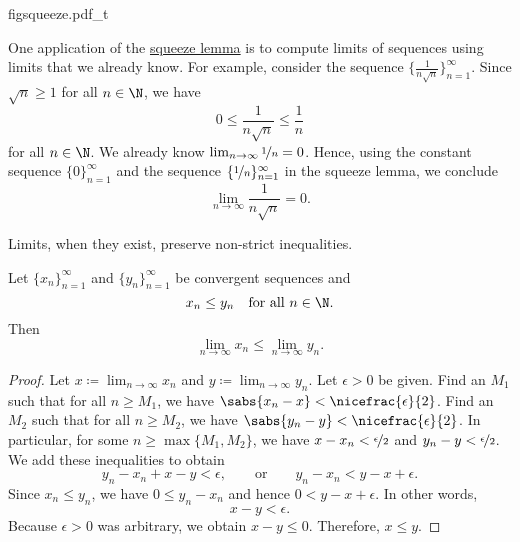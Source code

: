 \begin{myfigureht}
{figsqueeze.pdf_t}
\caption{Squeeze lemma proof in picture.\label{figsqueeze}}
\end{myfigureht}

\begin{example}
One application of
the \hyperref[squeeze:lemma]{squeeze lemma} is to compute limits of 
sequences using limits that we already know.  For example, consider
the sequence $\bigl\{ \frac{1}{n\sqrt{n}} \bigr\}_{n=1}^\infty$.
Since $\sqrt{n} \geq 1$ for all $n \in \N$, we have
\begin{equation*}
0 \leq \frac{1}{n\sqrt{n}} \leq \frac{1}{n}
\end{equation*}
for all $n \in \N$.  We already know $\lim_{n\to\infty} \nicefrac{1}{n} = 0$. 
Hence, using
the constant sequence $\{ 0 \}_{n=1}^\infty$ and the sequence
$\{ \nicefrac{1}{n} \}_{n=1}^\infty$ in the
squeeze lemma, we conclude
\begin{equation*}
\lim_{n\to\infty} \frac{1}{n\sqrt{n}} = 0 .
\end{equation*}
\end{example}

Limits, when they exist, preserve non-strict inequalities.

\begin{lemma} \label{limandineq:lemma}
Let $\{ x_n \}_{n=1}^\infty$ and $\{ y_n \}_{n=1}^\infty$ be
convergent sequences and
\begin{equation*}
x_n \leq y_n \quad \text{for all } n \in \N .
\end{equation*}
Then
\begin{equation*}
\lim_{n\to\infty} x_n \leq
\lim_{n\to\infty} y_n .
\end{equation*}
\end{lemma}

\begin{proof}
Let $x \coloneqq \lim_{n\to\infty} x_n$ and $y \coloneqq \lim_{n\to\infty} y_n$. 
Let 
$\epsilon > 0$ be given.  Find an $M_1$ such that for all $n \geq M_1$,
we have $\sabs{x_n-x} < \nicefrac{\epsilon}{2}$.  Find an $M_2$ such that
for all $n \geq M_2$, we have
$\sabs{y_n-y} < \nicefrac{\epsilon}{2}$.  In particular,
for some $n \geq \max\{ M_1, M_2 \}$, we have
$x-x_n < \nicefrac{\epsilon}{2}$ and
$y_n-y < \nicefrac{\epsilon}{2}$.  We add these inequalities to
obtain
\begin{equation*}
y_n-x_n+x-y < \epsilon, \qquad \text{or} \qquad
y_n-x_n < y-x+ \epsilon .
\end{equation*}
Since $x_n \leq y_n$, we have
$0 \leq y_n-x_n$ and hence $0 < y-x+ \epsilon$.
In other words,
\begin{equation*}
x-y < \epsilon .
\end{equation*}
Because $\epsilon > 0$ was arbitrary, we obtain
$x-y \leq 0$.
Therefore, $x \leq y$.
\end{proof}

